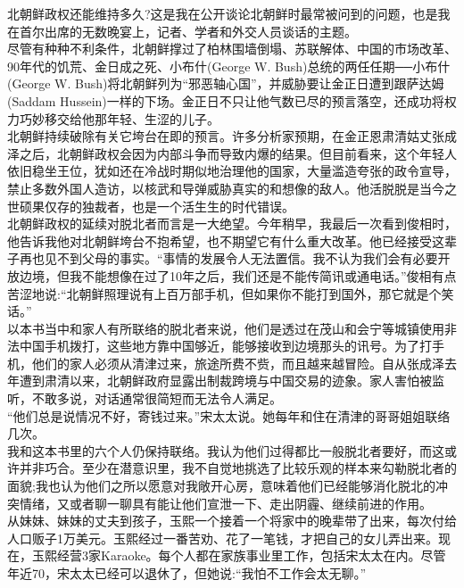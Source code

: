 北朝鲜政权还能维持多久?这是我在公开谈论北朝鲜时最常被问到的问题，也是我在首尔出席的无数晚宴上，记者、学者和外交人员谈话的主题。\\

尽管有种种不利条件，北朝鲜撑过了柏林围墙倒塌、苏联解体、中国的市场改革、90年代的饥荒、金日成之死、小布什(George W. Bush)总统的两任任期──小布什(George W. Bush)将北朝鲜列为“邪恶轴心国”，并威胁要让金正日遭到跟萨达姆(Saddam Hussein)一样的下场。金正日不只让他气数已尽的预言落空，还成功将权力巧妙移交给他那年轻、生涩的儿子。\\

北朝鲜持续破除有关它垮台在即的预言。许多分析家预期，在金正恩肃清姑丈张成泽之后，北朝鲜政权会因为内部斗争而导致内爆的结果。但目前看来，这个年轻人依旧稳坐王位，犹如还在冷战时期似地治理他的国家，大量滥造夸张的政令宣导，禁止多数外国人造访，以核武和导弹威胁真实的和想像的敌人。他活脱脱是当今之世硕果仅存的独裁者，也是一个活生生的时代错误。\\

北朝鲜政权的延续对脱北者而言是一大绝望。今年稍早，我最后一次看到俊相时，他告诉我他对北朝鲜垮台不抱希望，也不期望它有什么重大改革。他已经接受这辈子再也见不到父母的事实。“事情的发展令人无法置信。我不认为我们会有必要开放边境，但我不能想像在过了10年之后，我们还是不能传简讯或通电话。”俊相有点苦涩地说:“北朝鲜照理说有上百万部手机，但如果你不能打到国外，那它就是个笑话。”\\

以本书当中和家人有所联络的脱北者来说，他们是透过在茂山和会宁等城镇使用非法中国手机拨打，这些地方靠中国够近，能够接收到边境那头的讯号。为了打手机，他们的家人必须从清津过来，旅途所费不赀，而且越来越冒险。自从张成泽去年遭到肃清以来，北朝鲜政府显露出制裁跨境与中国交易的迹象。家人害怕被监听，不敢多说，对话通常很简短而无法令人满足。\\

“他们总是说情况不好，寄钱过来。”宋太太说。她每年和住在清津的哥哥姐姐联络几次。\\

我和这本书里的六个人仍保持联络。我认为他们过得都比一般脱北者要好，而这或许并非巧合。至少在潜意识里，我不自觉地挑选了比较乐观的样本来勾勒脱北者的面貌;我也认为他们之所以愿意对我敞开心房，意味着他们已经能够消化脱北的冲突情绪，又或者聊一聊具有能让他们宣泄一下、走出阴霾、继续前进的作用。\\

从妹妹、妹妹的丈夫到孩子，玉熙一个接着一个将家中的晚辈带了出来，每次付给人口贩子1万美元。玉熙经过一番苦劝、花了一笔钱，才把自己的女儿弄出来。现在，玉熙经营3家Karaoke。每个人都在家族事业里工作，包括宋太太在内。尽管年近70，宋太太已经可以退休了，但她说:“我怕不工作会太无聊。”\\

